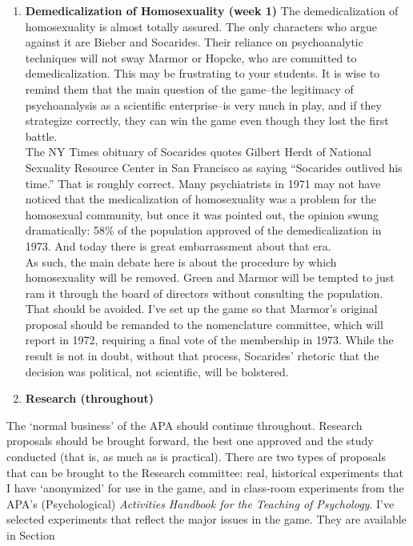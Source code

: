 \begin{refsection}
\begin{enumerate}
\item \textbf{Demedicalization of Homosexuality (week 1)}
The demedicalization of homosexuality is almost totally assured. The only characters who argue against it are Bieber and Socarides. Their reliance on psychoanalytic techniques will not sway Marmor or Hopcke, who are committed to demedicalization. This may be frustrating to your students. It is wise to remind them that the main question of the game--the legitimacy of psychoanalysis as a scientific enterprise--is very much in play, and if they strategize correctly, they can win the game even though they lost the first battle.\\
The NY Times obituary of Socarides quotes Gilbert Herdt of National Sexuality Resource Center in San Francisco as saying “Socarides outlived his time.” That is roughly correct. Many psychiatrists in 1971 may not have noticed that the medicalization of homosexuality was a problem for the homosexual community, but once it was pointed out, the opinion swung dramatically: 58\% of the population approved of the demedicalization in 1973. And today there is great embarrassment about that era.\\
As such, the main debate here is about the procedure by which homosexuality will be removed. Green and Marmor will be tempted to just ram it through the board of directors without consulting the population. That should be avoided. I've set up the game so that Marmor's original proposal should be remanded to the nomenclature committee, which will report in 1972, requiring a final vote of the membership in 1973. While the result is not in doubt, without that process, Socarides' rhetoric that the decision was political, not scientific, will be bolstered.

\item \textbf{Research (throughout)} 

\end{enumerate}

The ‘normal business’ of the APA should continue throughout. Research proposals should be brought forward, the best one approved and the study conducted (that is, as much as is practical). There are two types of proposals that can be brought to the Research committee: real, historical experiments that I have `anonymized' for use in the game, and in class-room experiments from the APA’s (Psychological) \emph{Activities Handbook for the Teaching of Psychology}. I’ve selected experiments that reflect the major issues in the game. They are available in Section 


\end{refsection}
